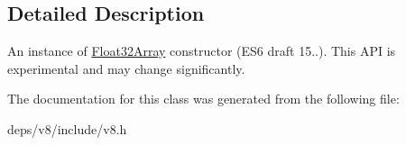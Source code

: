 \subsection{Detailed Description}
An instance of \hyperlink{classv8_1_1_float32_array}{Float32\+Array} constructor (E\+S6 draft 15..). This A\+P\+I is experimental and may change significantly. 

The documentation for this class was generated from the following file\+:\begin{DoxyCompactItemize}
\item 
deps/v8/include/v8.\+h\end{DoxyCompactItemize}
